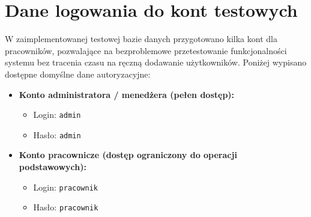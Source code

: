 \section{Dane logowania do kont testowych}
W zaimplementowanej testowej bazie danych przygotowano kilka kont dla pracowników, pozwalające na bezproblemowe przetestowanie funkcjonalności systemu bez tracenia czasu na ręczną dodawanie użytkowników. Poniżej wypisano dostępne domyślne dane autoryzacyjne:
\begin{itemize}
    \item \textbf{Konto administratora / menedżera (pełen dostęp):}
          \begin{itemize}
              \item Login: \texttt{admin}
              \item Hasło: \texttt{admin}
          \end{itemize}
          \vspace{0.3cm}
    \item \textbf{Konto pracownicze (dostęp ograniczony do operacji podstawowych):}
          \begin{itemize}
              \item Login: \texttt{pracownik}
              \item Hasło: \texttt{pracownik}
          \end{itemize}
\end{itemize}
